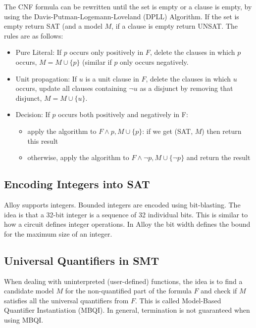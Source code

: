 The CNF formula can be rewritten until the set is empty or a clause is empty, by using the Davis-Putman-Logemann-Loveland (DPLL) Algorithm. If the set is empty return SAT (and a model $M$, if a clause is empty return UNSAT. The rules are as follows:
\begin{itemize}
	\item Pure Literal: If $p$ occurs only positively in $F$, delete the clauses in which $p$ occurs, $M = M \cup \{p\}$ (similar if $p$ only occurs negatively.
	\item Unit propagation: If $u$ is a unit clause in $F$, delete the clauses in which $u$ occurs, update all clauses containing $\neg u$ as a disjunct by removing that disjunct, $M = M \cup \{ u \}$.
	\item Decision: If $p$ occurs both positively and negatively in F: 
	\begin{itemize}
		\item apply the algorithm to $F \wedge p, M \cup \{p\}$: if we get (SAT, $M$) then return this result
		\item otherwise, apply the algorithm to $F \wedge \neg p, M \cup \{ \neg p\}$ and return the result
	\end{itemize}
\end{itemize}


\subsection{Encoding Integers into SAT}

Alloy supports integers. Bounded integers are encoded using bit-blasting. The idea is that a 32-bit integer is a sequence of 32 individual bits. This is similar to how a circuit defines integer operations. In Alloy the bit width defines the bound for the maximum size of an integer.


\subsection{Universal Quantifiers in SMT}

When dealing with uninterpreted (user-defined) functions, the idea is to find a candidate model $M$ for the non-quantified part of the formula $F$ and check if $M$ satisfies all the universal quantifiers from $F$. This is called Model-Based Quantifier Instantiation (MBQI). In general, termination is not guaranteed when using MBQI.
